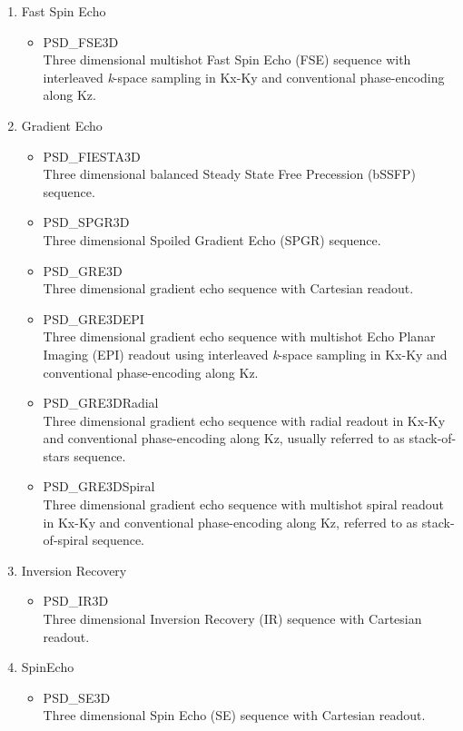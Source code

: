 \documentclass{book}%
\begin{document}
\begin{enumerate}
	\item Fast Spin Echo 
	
	\begin{itemize}
	\item PSD\_FSE3D \\
	Three dimensional multishot Fast Spin Echo (FSE) sequence with interleaved \textit{k}-space sampling in Kx-Ky and conventional phase-encoding along Kz. 
\end{itemize}

\item Gradient Echo

\begin{itemize}
	\item PSD\_FIESTA3D \\
	Three dimensional balanced Steady State Free Precession (bSSFP) sequence.
	\item PSD\_SPGR3D \\
	Three dimensional Spoiled Gradient Echo (SPGR) sequence.
	\item PSD\_GRE3D \\
	Three dimensional gradient echo sequence with Cartesian readout.
	\item PSD\_GRE3DEPI \\
	Three dimensional gradient echo sequence with multishot Echo Planar Imaging (EPI) readout using interleaved \textit{k}-space sampling in Kx-Ky and conventional phase-encoding along Kz. 
	\item PSD\_GRE3DRadial \\
	Three dimensional gradient echo sequence with radial readout in Kx-Ky and conventional phase-encoding along Kz, usually referred to as stack-of-stars sequence.
	\item PSD\_GRE3DSpiral \\
	Three dimensional gradient echo sequence with multishot spiral readout in Kx-Ky and conventional phase-encoding along Kz, referred to as stack-of-spiral sequence. 
\end{itemize}

\item Inversion Recovery
\begin{itemize}
	\item PSD\_IR3D \\
	Three dimensional Inversion Recovery (IR) sequence with Cartesian readout.
\end{itemize}

\item SpinEcho
\begin{itemize}
	\item PSD\_SE3D \\
	Three dimensional Spin Echo (SE) sequence with Cartesian readout.
\end{itemize}


\end{enumerate}
\end{document}
